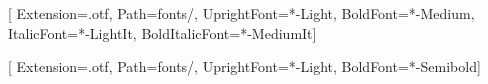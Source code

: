 
\newcommand{\sourcecodeprodir}[0]{fonts/}
\newcommand{\sourceserifprodir}[0]{fonts/}

\newcommand{\codepromd}[0]{Light}
\newcommand{\codeprobf}[0]{Medium}
\newcommand{\codeproit}[0]{LightIt}
\newcommand{\codeprobi}[0]{MediumIt}
\newcommand{\serifpromd}[0]{Light}
\newcommand{\serifprobf}[0]{Semibold}

\newfontfamily{}[
  Extension=.otf,
  Path=\sourcecodeprodir,
  UprightFont=*-\codepromd,
  BoldFont=*-\codeprobf,
  ItalicFont=*-\codeproit,
  BoldItalicFont=*-\codeprobi]

\newfontfamily{}[
  Extension=.otf,
  Path=\sourceserifprodir,
  UprightFont=*-\serifpromd,
  BoldFont=*-\serifprobf]

\newcommand{\serif}[0]{\SourceSerifPro}

\newcommand{\setdefaultwesternfonts}[0]{
  
  \setmonofont{SourceCodePro}[
    Extension=.otf,
    Path=\sourcecodeprodir,
    UprightFont=*-\codepromd,
    BoldFont=*-\codeprobf,
    ItalicFont=*-\codeproit,
    BoldItalicFont=*-\codeprobi]

}


